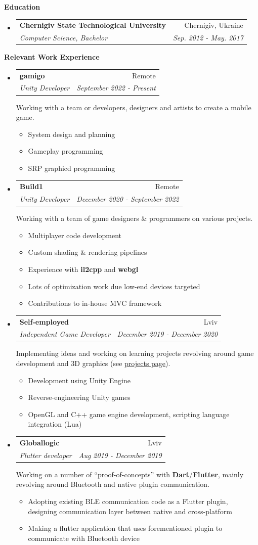 \documentclass[letterpaper,11pt]{article}
\makeatletter
\newcommand{\resitem}[1]{\item #1 \vspace{-2pt}}
\newcommand{\resheading}[1]{{\vspace{.2in} \large \colorbox{title_bg}{\begin{minipage}{\textwidth}{\textbf{#1 \vphantom{p\^{E}}}}\end{minipage}}}}
\newcommand{\ressubheading}[4]{
\begin{tabular*}{7.1in}{l@{\extracolsep{\fill}}r}
		\textbf{#1} & #2 \\
		\textit{#3} & \textit{#4} \\
\end{tabular*}\vspace{0pt}}
\makeatother
\begin{document}
\resheading{Education}
\begin{itemize}
\item
	\ressubheading{Chernigiv State Technological University}{Chernigiv, Ukraine}{Computer Science, Bachelor}{Sep. 2012 - May. 2017}
\end{itemize}

\resheading{Relevant Work Experience}
\begin{itemize}
	\item
		\ressubheading{gamigo}{Remote}{Unity Developer}{September 2022 - Present}

		Working with a team or developers, designers and artists to create a mobile game.
		\begin{itemize}
				\resitem{System design and planning}
				\resitem{Gameplay programming}
				\resitem{SRP graphicd programming}
		\end{itemize}

	\item
		\ressubheading{Build1}{Remote}{Unity Developer}{December 2020 - September 2022}

		Working with a team of game designers \& programmers on various projects.
		\begin{itemize}
				\resitem{Multiplayer code development}
				\resitem{Custom shading \& rendering pipelines}
				\resitem{Experience with \textbf{il2cpp} and \textbf{webgl}}
				\resitem{Lots of optimization work due low-end devices targeted}
				\resitem{Contributions to in-house MVC framework}
		\end{itemize}

	\item
		\ressubheading{Self-employed}{Lviv}{Independent Game Developer}{December 2019 - December 2020}

		Implementing ideas and working on learning projects revolving around game development and 3D graphics (see \href{https://shdwp.github.io/about/projects/}{\textcolor{link_fg}{\underline{projects page}}}). \\
		\begin{itemize}
				\resitem{Development using Unity Engine}
				\resitem{Reverse-engineering Unity games}
				\resitem{OpenGL and C++ game engine development, scripting language integration (Lua)}
		\end{itemize}

	\item
		\ressubheading{Globallogic}{Lviv}{Flutter developer}{Aug 2019 - December 2019}
		
		Working on a number of ``proof-of-concepts'' with \textbf{Dart}/\textbf{Flutter}, mainly revolving around Bluetooth and native plugin communication.
		\begin{itemize}
				\resitem{Adopting existing BLE communication code as a Flutter plugin, designing communication layer between native and cross-platform}
				\resitem{Making a flutter application that uses forementioned plugin to communicate with Bluetooth device}
		\end{itemize}


\end{itemize}
\end{document}
